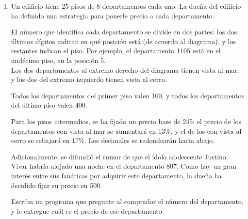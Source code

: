 \documentclass[11pt,spanish]{article}
\newcommand{\pond}[1]{[{\small\textbf{#1\%}}]}
\begin{document}
\begin{enumerate}[font=\Large\bfseries]
    \newpage
    \item
      \pond{25}
      Un edificio tiene 25 pisos de 8 departamentos cada uno.
      La dueña del edificio ha definido una estrategia
      para ponerle precio a cada departamento.

      \begin{minipage}[T]{.71\textwidth}
        El número que identifica cada departamento se divide en dos partes:
        los dos últimos dígitos indican en qué posición está
        (de acuerdo al diagrama),
        y los restantes indican el piso.
        Por ejemplo, el departamento 1105 está en el undécimo piso,
        en la posición 5.
        \\[.6ex]
        Los dos departamentos al extremo derecho del diagrama
        tienen vista al mar,
        y los dos del extremo izquierdo
        tienen vista al cerro.
      \end{minipage}
      \hspace{1em}
      \begin{minipage}[T]{.25\textwidth}
      \end{minipage}

      Todos los departamentos del primer piso valen 100,
      y todos los departamentos del último piso valen 400.

      Para los pisos intermedios,
      se ha fijado un precio base de 245;
      el precio de los departamentos con vista al mar se aumentará en 13\%,
      y el de los con vista al cerro se rebajará en 17\%.
      Los decimales se redondearán hacia abajo.

      Adicionalmente,
      se difundió el rumor de que el ídolo adolescente Justino Vivar
      habría alojado una noche en el departamento 807.
      Como hay un gran interés entre sus fanáticas
      por adquirir este departamento,
      la dueña ha decidido fijar su precio en 500.

      Escriba un programa que pregunte al comprador el número del departamento,
      y le entregue cuál es el precio de ese departamento.


\end{enumerate}
\end{document}
